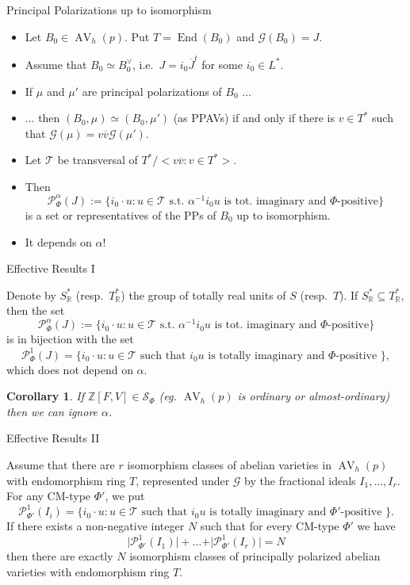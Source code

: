 \documentclass[usenames,dvipsnames,handout]{beamer}
\def\Z{\mathbb{Z}}
\def\R{\mathbb{R}}
\DeclareMathOperator{\AV}{AV}
\DeclareMathOperator{\End}{End}
\newcommand{\cG}{\mathcal{G}}
\newcommand{\cT}{{\mathcal T}}
\newcommand{\Palpha}[2]{\mathcal{P}^{\alpha}_{{#1}}({#2})}
\newcommand{\Pone}[2]{\mathcal{P}^{1}_{{#1}}({#2})}
\newtheorem{cor}[df]{Corollary}
\begin{document}
\begin{frame}{ Principal Polarizations up to isomorphism }
    \begin{itemize}
	 \item Let $B_0 \in \AV_h(p)$. Put $T=\End(B_0)$ and $\cG(B_0)=J$.
	 \pause \item Assume that $B_0 \simeq B_0^\vee$, i.e.~$J=i_0\overline{J}^t$ for some $i_0\in L^*$.
	 \pause \item If $\mu$ and $\mu'$ are principal polarizations of $B_0$ ...
	 \pause \item ... then $(B_0,\mu) \simeq (B_0,\mu')$ (as PPAVs) if and only if there is $v\in T^*$ such that $\cG(\mu)=v\overline{v}\cG(\mu')$.
	 \pause \item Let $\cT$ be transversal of $T^*/<v\overline{v} : v \in T^*>$.
	 \pause \item Then 
	 \[ \Palpha{\Phi}{J}:=\{ i_0 \cdot u  : u \in \mathcal{T} \text{ s.t.~} \alpha^{-1} i_0 u \text{ is tot.~imaginary and } \Phi\text{-positive} \} \]
	 is a set or representatives of the PPs of $B_0$ up to isomorphism.
	 \pause \item It depends on $\alpha$!
	\end{itemize}
\end{frame}

\begin{frame}{ Effective Results I }
	\begin{theorem}[1]
		Denote by $S^*_\R$ (resp.~$T^*_\R$) the group of totally real units of $S$ (resp.~$T$).
		\pause If $S^*_\R\subseteq T^*_\R$, then the set
		\[ \Palpha{\Phi}{J}:=\{ i_0 \cdot u  : u \in \mathcal{T} \text{ s.t.~} \alpha^{-1} i_0 u \text{ is tot.~imaginary and } \Phi\text{-positive} \} \]
	    is in bijection with the set
		\pause \[
		    \Pone{\Phi}{J}=\{ i_0 \cdot u: u \in \mathcal{T} \text{ such that } i_0 u \text{ is totally imaginary and $\Phi$-positive } \},
		\]
		which does not depend on $\alpha$.
	\end{theorem}
	\pause 
	\begin{cor}
		If $\Z[F,V] \in \mathcal{S}_\Phi$ (eg. $\AV_h(p)$ is ordinary or almost-ordinary) then we can ignore $\alpha$.
	\end{cor}
\end{frame}

\begin{frame}{ Effective Results II }
	\begin{theorem}[2]
		Assume that there are $r$ isomorphism classes of abelian varieties in $\AV_h(p)$ with endomorphism ring $T$, represented under $\cG$ by the fractional ideals  $I_1,\ldots,I_r$.
		\pause For any CM-type $\Phi'$, we put
		\[   \Pone{\Phi'}{I_i}=\{ i_0 \cdot u: u \in \mathcal{T} \text{ such that } i_0 u \text{ is totally imaginary and $\Phi'$-positive } \}. \]
		\pause If there exists a non-negative integer $N$ such that for every CM-type $\Phi'$ we have
		\[
		    \vert \Pone{\Phi'}{I_1} \vert + \ldots + \vert \Pone{\Phi'}{I_r} \vert = N
		\]
		then there are exactly $N$ isomorphism classes of principally polarized abelian varieties with endomorphism ring $T$. 
	\end{theorem}
\end{frame}
\end{document}
